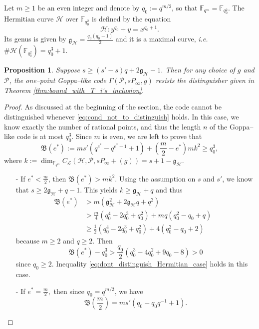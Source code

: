 \documentclass[peerreview]{IEEEtran}
\theoremstyle{plain}
\newtheorem{proposition}[thm]{Proposition}
\theoremstyle{definition}
\theoremstyle{remark}
\newcommand{\calP}{\mathcal{P}}
\newcommand{\calH}{\mathcal{H}}
\newcommand{\fqm}{\mathbb{F}_{q^m}}
\newcommand{\fqo}{\mathbb{F}_{q_0^2}}
\begin{document}
	Let $m \geq 1$  be an even integer and denote by $q_0 := q^{m/2}$, so that $\fqm = \fqo$. The Hermitian curve $\calH$ over $\fqo$ is defined by the equation
	$$\calH : y^{q_0}+y = x^{q_0+1}.$$
	Its genus is given by $\mathfrak{g}_{\calH} = \frac{q_0(q_0-1)}{2}$ and it is a maximal curve, \emph{i.e.} $\#\calH(\fqo) = q_0^3+1$.
	
	\begin{proposition} \label{prop:Hermitian_Goppa_like_are_secured}
		Suppose $s \geq (s'-s)q+2\mathfrak{g}_{\calH}-1$. Then for any choice of $g$ and $\calP$, the one--point Goppa--like code $\Gamma(\calP,sP_\infty,g)$ resists the distinguisher given in Theorem \ref{thm:bound_with_T_i's_inclusion}.
	\end{proposition}
	
	\begin{proof}
		As discussed at the beginning of the section, the code cannot be distinguished whenever \eqref{eq:cond_not_to_distinguish} holds. In this case, we know exactly the number of rational points, and thus the length $n$ of the Goppa--like code is at most $q_0^3$. Since $m$ is even, we are left to prove that 
		\begin{equation} \label{eq:dont_distinguish_Hermitian_case}
			\mathfrak{B}(e^*) := ms'(q^{e^*}-q^{e^*-1}+1) + \left( \frac{m}{2}-e^*\right)mk^2 \geq q_0^3,
		\end{equation}
		where $k  := \dim_{\fqm} C_{\mathcal{L}}(\calH, \calP, sP_\infty + (g)) = s+1-\mathfrak{g}_{\calH}$.
		\begin{itemize}
			\item [-] If $e^* < \frac{m}{2}$, then $\mathfrak{B}(e^*) > mk^2$. Using the assumption on $s$ and $s'$, we know that $s \geq 2\mathfrak{g}_{\calH}+q-1$. This yields $k \geq \mathfrak{g}_{\calH}+q$ and thus
			\begin{align*}
				\mathfrak{B}(e^*) 
				&> m(\mathfrak{g}_{\calH}^2+2\mathfrak{g}_{\calH}q+q^2)&\\
				& > \frac{m}{4}(q_0^4-2q_0^3+q_0^2) + mq(q_0^2-q_0+q)&\\
				& \geq \frac{1}{2}(q_0^4-2q_0^3+q_0^2)+4(q_0^2-q_0+2)
			\end{align*}
		because $m\geq 2$ and $q\geq 2$. Then 
		\[\mathfrak{B}(e^*) -q_0^3 > \frac{q_0}{2} (q_0^3-4q_0^2+9q_0-8) > 0 \]
			since $q_0 \geq 2$. Inequality \eqref{eq:dont_distinguish_Hermitian_case} holds in this case.
			\item[-] If $e^* = \frac{m}{2},$ then since $q_0=q^{m/2}$, we have 
			\[\mathfrak{B}\left(\frac{m}{2}\right) = ms'(q_0-q_0q^{-1}+1).\]

\end{itemize}
\end{proof}
\end{document}
